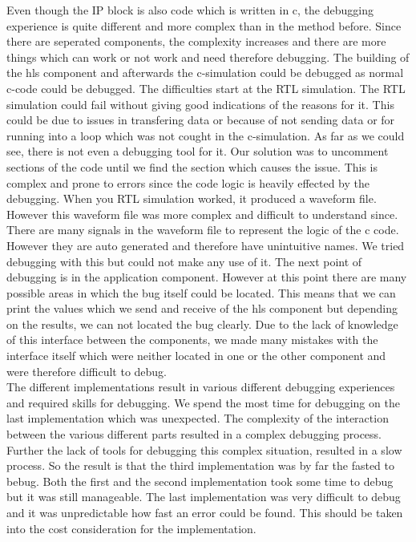 \documentclass[conference]{IEEEtran}
\begin{document}
Even though the IP block is also code which is written in c, the debugging experience is quite different and more complex than in the method before. Since there are seperated components, the complexity increases and there are more things which can work or not work and need therefore debugging. The building of the hls component and afterwards the c-simulation could be debugged as normal c-code could be debugged. The difficulties start at the RTL simulation. The RTL simulation could fail without giving good indications of the reasons for it. This could be due to issues in transfering data or because of not sending data or for running into a loop which was not cought in the c-simulation. As far as we could see, there is not even a debugging tool for it. Our solution was to uncomment sections of the code until we find the section which causes the issue. This is complex and prone to errors since the code logic is heavily effected by the debugging. When you RTL simulation worked, it produced a waveform file. However this waveform file was more complex and difficult to understand since. There are many signals in the waveform file to represent the logic of the c code. However they are auto generated and therefore have unintuitive names. We tried debugging with this but could not make any use of it. The next point of debugging is in the application component. However at this point there are many possible areas in which the bug itself could be located. This means that we can print the values which we send and receive of the hls component but depending on the results, we can not located the bug clearly. Due to the lack of knowledge of this interface between the components, we made many mistakes with the interface itself which were neither located in one or the other component and were therefore difficult to debug. \\
The different implementations result in various different debugging experiences and required skills for debugging. We spend the most time for debugging on the last implementation which was unexpected. The complexity of the interaction between the various different parts resulted in a complex debugging process. Further the lack of tools for debugging this complex situation, resulted in a slow process. So the result is that the third implementation was by far the fasted to bebug. Both the first and the second implementation took some time to debug but it was still manageable. The last implementation was very difficult to debug and it was unpredictable how fast an error could be found. This should be taken into the cost consideration for the implementation.
\end{document}
